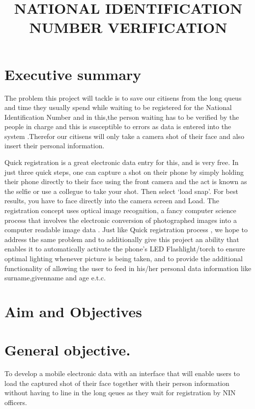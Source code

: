 \documentclass{article}
\begin{document}
\title{NATIONAL  IDENTIFICATION  NUMBER VERIFICATION}
\maketitle

\section {Executive summary }
{The problem this project will tackle is to save our citisens from the long queus and time they usually spend while waiting to be registered for the National Identification Number and in this,the person waiting has to be verified by the people in charge and this is susceptible to errors as data is entered into the system   .Therefor our citisens will only take a camera shot of their face and also insert their personal information.

Quick registration  is a great electronic data entry  for this, and is very free. In just three quick steps, one can capture a shot on their phone by simply holding their phone directly to their face using the front  camera and the act is known as the selfie or use a collegue to take your shot. Then select `load snap’. For best results, you have to face directly into the camera screen and Load. The registration concept  uses optical image  recognition, a fancy computer science process that involves the electronic conversion of photographed images into a computer readable image data .
Just like Quick registration process , we hope to address the same problem and to additionally give this project an ability that enables it to automatically activate the phone’s LED Flashlight/torch to ensure optimal lighting whenever picture is being taken, and to provide the additional functionality of allowing the user to feed in  his/her personal data information like surname,givenname and age e.t.c.
}







\section{ Aim and Objectives}

 \section{General objective.}
{To develop a mobile electronic data with an interface that will enable users to load the captured shot of their face together with their person information  without having to line in the long qeues as they wait for registration by NIN officers.
}
\end{document}
